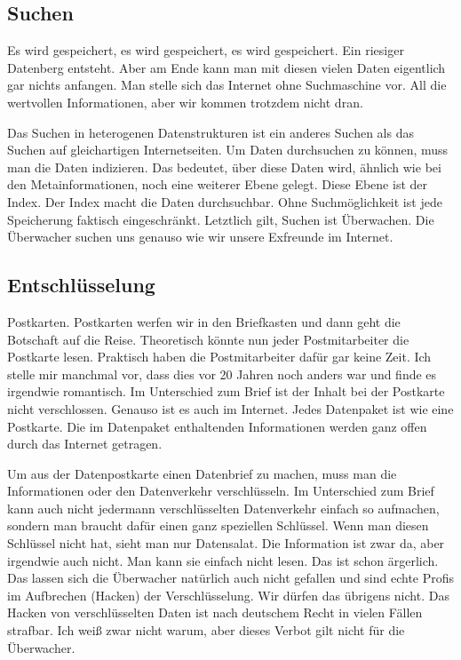 	\subsection{Suchen}
	Es wird gespeichert, es wird gespeichert, es wird gespeichert. Ein riesiger Datenberg entsteht. Aber am Ende kann man mit diesen vielen Daten eigentlich gar nichts anfangen. Man stelle sich das Internet ohne Suchmaschine vor. All die wertvollen Informationen, aber wir kommen trotzdem nicht dran.
	
	Das Suchen in heterogenen Datenstrukturen ist ein anderes Suchen als das Suchen auf gleichartigen Internetseiten. Um Daten durchsuchen zu können, muss man die Daten indizieren. Das bedeutet, über diese Daten wird, ähnlich wie bei den Metainformationen, noch eine weiterer Ebene gelegt. Diese Ebene ist der Index. Der Index macht die Daten durchsuchbar. Ohne Suchmöglichkeit ist jede Speicherung faktisch eingeschränkt. Letztlich gilt, Suchen ist Überwachen. Die Überwacher suchen uns genauso wie wir unsere Exfreunde im Internet.
	
	\subsection{Entschlüsselung}
	Postkarten. Postkarten werfen wir in den Briefkasten und dann geht die Botschaft auf die Reise. Theoretisch könnte nun jeder Postmitarbeiter die Postkarte lesen. Praktisch haben die Postmitarbeiter dafür gar keine Zeit. Ich stelle mir manchmal vor, dass dies vor 20 Jahren noch anders war und finde es irgendwie romantisch. Im Unterschied zum Brief ist der Inhalt bei der Postkarte nicht verschlossen. Genauso ist es auch im Internet. Jedes Datenpaket ist wie eine Postkarte. Die im Datenpaket enthaltenden Informationen werden ganz offen durch das Internet getragen.
	
	Um aus der Datenpostkarte einen Datenbrief zu machen, muss man die Informationen oder den Datenverkehr verschlüsseln. Im Unterschied zum Brief kann auch nicht jedermann verschlüsselten Datenverkehr einfach so aufmachen, sondern man braucht dafür einen ganz speziellen Schlüssel. Wenn man diesen Schlüssel nicht hat, sieht man nur Datensalat. Die Information ist zwar da, aber irgendwie auch nicht. Man kann sie einfach nicht lesen. Das ist schon ärgerlich. Das lassen sich die Überwacher natürlich auch nicht gefallen und sind echte Profis im Aufbrechen (Hacken) der Verschlüsselung. Wir dürfen das übrigens nicht. Das Hacken von verschlüsselten Daten ist nach deutschem Recht in vielen Fällen strafbar. Ich weiß zwar nicht warum, aber dieses Verbot gilt nicht für die Überwacher.
	
